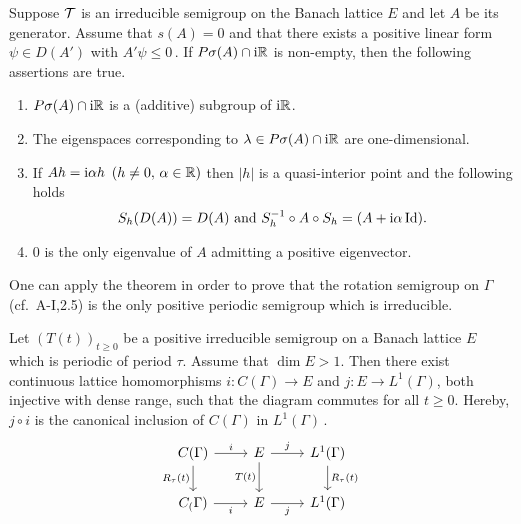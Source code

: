 \begin{theorem}\label{thm:c3-3.8}
	
	Suppose $\mathcal{T}$ is an irreducible semigroup on the Banach lattice $E$ and let $A$ be its generator.
	Assume that $s(A) = 0$ and that there exists a positive linear form $\psi \in D(A')$ with $A'\psi \leq 0$\,.
%
If $P\sigma(A)\cap \mathrm{i}\mathbb{R} $ is non-empty, then the following assertions are true.
	\begin{enumerate}[\upshape (i), wide, labelsep=1em, itemsep=1ex]
		\item 
			$P\sigma(A)\cap \mathrm{i}\mathbb{R} $ is a (additive) subgroup of $\mathrm{i}\mathbb{R} $.
	
		\item 
		The eigenspaces corresponding to $\lambda \in P\sigma(A)\cap \mathrm{i}\mathbb{R} $ are one-dimensional.
	
		\item 
		If $Ah = \mathrm{i}\alpha h$ $(h \neq 0,\, \alpha \in \mathbb{R} )$ then $|h|$ is a quasi-interior point and the following holds
		\begin{equation}\label{eq:c3-3.13}
			S_{h}(D(A)) = D(A) \text{ and } S_{h}^{-1}\circ A\circ S_{h} = (A + \mathrm{i}\alpha\operatorname{Id}).
		\end{equation}
		
		\item 
		$0$ is the only eigenvalue of $A$ admitting a positive eigenvector.

	\end{enumerate}
\end{theorem}

One can apply the theorem in order to prove that the rotation semigroup on $\Gamma$ (cf.\ A-I,2.5) is the only positive periodic semigroup which is irreducible.

\begin{corollary}\label{cor:c3-3.9}
	
	Let $(T(t))_{t\geq 0}$ be a positive irreducible semigroup on a Banach lattice $E$ which is periodic of period $\tau$.
	Assume that $\dim E > 1$.
	Then there exist continuous lattice homomorphisms
	$i \colon C(\Gamma) \to E$ and $j \colon E \to L^{1}(\Gamma)$,
	both injective with dense range,
	such that the diagram commutes for all $t\geq 0$.
	Hereby, $j\circ i$ is the canonical inclusion of $C(\Gamma)$ in $L^{1}(\Gamma)$\,.
	\[ 
	\begin{tikzcd}
		C(\Gamma) \arrow[r, "i"] \arrow[d, "R_\tau(t)"'] & E  \arrow[r, "j"] \arrow[d, "T(t)"'] & L^1(\Gamma) \arrow[d, "R_\tau(t)"] \\
		C_(\Gamma) \arrow[r, "i"'] & E \arrow[r, "j"'] & L^{1}(\Gamma)
	\end{tikzcd}
	\]
\end{corollary}
	
